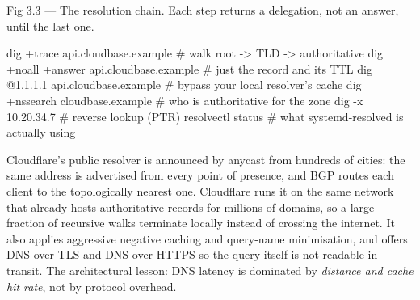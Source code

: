 \begin{wbfigure}{Fig 3.3 — The resolution chain. Each step returns a delegation, not an answer, until the last one.}
\end{wbfigure}

\begin{bashbox}
dig +trace api.cloudbase.example      # walk root -> TLD -> authoritative
dig +noall +answer api.cloudbase.example   # just the record and its TTL
dig @1.1.1.1 api.cloudbase.example    # bypass your local resolver's cache
dig +nssearch cloudbase.example       # who is authoritative for the zone
dig -x 10.20.34.7                     # reverse lookup (PTR)
resolvectl status                     # what systemd-resolved is actually using
\end{bashbox}

 Cloudflare's public resolver  is announced by anycast from hundreds of cities: the same address is advertised from every point of presence, and BGP routes each client to the topologically nearest one. Cloudflare runs it on the same network that already hosts authoritative records for millions of domains, so a large fraction of recursive walks terminate locally instead of crossing the internet. It also applies aggressive negative caching and query-name minimisation, and offers DNS over TLS and DNS over HTTPS so the query itself is not readable in transit. The architectural lesson: DNS latency is dominated by \emph{distance and cache hit rate}, not by protocol overhead.

